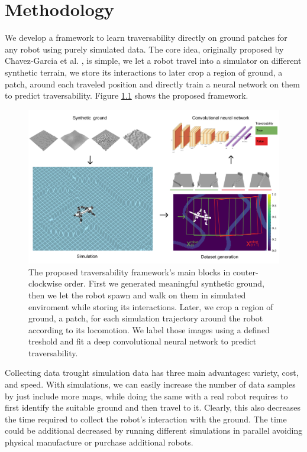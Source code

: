\documentclass[../document.tex]{subfiles}
\begin{document}
\chapter{Methodology}
We develop a framework to learn traversability directly on ground patches for any robot using purely simulated data. The core idea, originally proposed by Chavez-Garcia et al. \cite{omar2018traversability}, is simple, we let a robot travel into a simulator on different synthetic terrain, we store its interactions to later crop a region of ground, a patch, around each traveled position and directly train a neural network on them to predict traversability. Figure \ref{fig : pipeline} shows the proposed framework.
\begin{figure}[H]
    \centering
        \includegraphics[width=\textwidth]{../img/method.png}
    \caption{The proposed traversability framework's main blocks in couter-clockwise order. First we generated meaningful synthetic ground, then we let the robot spawn and walk on them in simulated enviroment while storing its interactions. Later, we crop a region of ground, a patch, for each simulation trajectory around the robot according to its locomotion. We label those images using a defined treshold and fit a deep convolutional neural network to predict traversability. }
    \label{fig : pipeline}
    \end{figure}
Collecting data trought simulation data has three main advantages: variety, cost, and speed. With simulations, we can easily increase the number of data samples by just include more maps, while doing the same with a real robot requires to first identify the suitable ground and then travel to it. Clearly, this also decreases the time required to collect the robot's interaction with the ground. The time could be additional decreased by running different simulations in parallel avoiding physical manufacture or purchase additional robots. 
\end{document}
